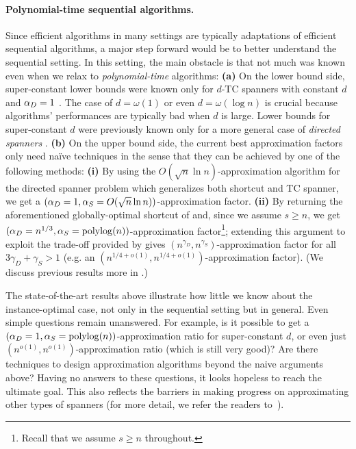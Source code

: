 \paragraph{Polynomial-time sequential algorithms.}
Since efficient algorithms in many settings are typically adaptations of efficient sequential algorithms, a major step forward would be to better understand the sequential setting. 
In this setting, the main obstacle is that not much was known even when we relax to {\em polynomial-time} algorithms: 
{\bf (a)} On the lower bound side, super-constant lower bounds were known only for $d$-TC spanners with constant $d$ and $\alpha_D=1$ \cite{BhattacharyyaGJRW12}. The case of $d=\omega(1)$ or even $d=\omega(\log n)$ is crucial because algorithms' performances are typically bad when $d$ is large. 
Lower bounds for super-constant $d$ were previously known only for a more general case of {\em directed spanners} \cite{ElkinP07}. 
{\bf (b)}
On the upper bound side, the current best approximation factors only need na\"{i}ve techniques in the sense that they can be achieved by one of the following methods:
{\bf (i)} By using the $O(\sqrt{n}\ln n)$-approximation algorithm \cite{BermanBMRY11} for the directed spanner problem which generalizes both shortcut and TC spanner, we get a $(\alpha_D=1, \alpha_S=O(\sqrt{n}\ln n))$-approximation factor. 
{\bf (ii)} By returning the aforementioned globally-optimal shortcut of \cite{KoganP22} and, since we assume $s\geq n$, we get  $(\alpha_D=n^{1/3}, \alpha_S=\mathrm{polylog}(n))$-approximation factor\footnote{Recall that we assume $s\geq n$ throughout.}; extending this argument to exploit the trade-off provided by  \cite{KoganP22} gives $(n^{\gamma_D}, n^{\gamma_S})$-approximation factor for all $3\gamma_D + \gamma_S>1$ (e.g. an $(n^{1/4+o(1)}, n^{1/4+o(1)})$-approximation factor).
(We discuss previous results more in .)




The state-of-the-art results above illustrate how little we know about the instance-optimal case, not only in the sequential setting but in general.
Even simple questions remain unanswered. 
For example, is it possible to get a $(\alpha_D=1, \alpha_S=\mathrm{polylog}(n))$-approximation ratio for super-constant $d$, or even just $(n^{o(1)}, n^{o(1)})$-approximation ratio (which is still very good)? Are there techniques to design approximation algorithms beyond the naive arguments above? Having no answers to these questions, it looks hopeless to reach the ultimate goal.
This also reflects the barriers in making progress on approximating other types of spanners (for more detail, we refer the readers to~\cite{BermanBMRY13, DinitzZ16, KortsarzP94, DinitzKR16, AhmedBSHJKS20}). 











